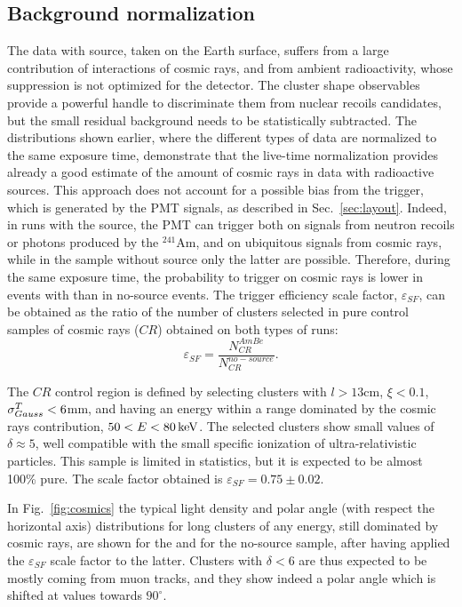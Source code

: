 \subsection{Background normalization}
\label{sec:background}
The data with \ambe source, taken on the Earth surface, suffers from a
large contribution of interactions of cosmic rays, and from ambient
radioactivity, whose suppression is not optimized for the \lemon
detector. The cluster shape observables provide a powerful handle to
discriminate them from nuclear recoils candidates, but the small
residual background needs to be statistically subtracted. The
distributions shown earlier, where the different types of data are
normalized to the same exposure time, demonstrate that the live-time
normalization provides already a good estimate of the amount of cosmic
rays in data with radioactive sources. This approach does not account
for a possible bias from the trigger, which is generated by the PMT
signals, as described in Sec.~\ref{sec:layout}. Indeed, in runs with
the \ambe source, the PMT can trigger both on signals from neutron
recoils or photons produced by the $^{241}$Am, and on ubiquitous
signals from cosmic rays, while in the sample without source only the
latter are possible.  Therefore, during the same exposure time,
the probability to trigger on cosmic rays is lower in events
with \ambe than in no-source events. The trigger efficiency scale
factor, $\varepsilon_{SF}$, can be obtained as the ratio of the number
of clusters selected in pure control samples of cosmic rays ($CR$)
obtained on both types of runs:
\begin{equation}
\label{eq:sfeff}
\varepsilon_{SF} = \frac{N^{AmBe}_{CR}}{N^{no-source}_{CR}}.
\end{equation}

The $CR$ control region is defined by selecting clusters with
$l>13$\unit{cm}, $\xi<0.1$, $\sigma^T_{Gauss}<6$\unit{mm}, and having an
energy within a range dominated by the cosmic rays contribution,
$50<E<80\,\textrm{ke\hspace{-.08em}V}$. The selected clusters show small values of
$\delta\approx5$, well compatible with the small specific ionization
of ultra-relativistic particles.  This sample is limited in
statistics, but it is expected to be almost 100\% pure. The scale
factor obtained is $\varepsilon_{SF}=0.75\pm0.02$.

In Fig.~\ref{fig:cosmics} the typical light density and polar angle
(with respect the horizontal axis) distributions for long clusters of
any energy, still dominated by cosmic rays, are shown for the \ambe
and for the no-source sample, after having applied the
$\varepsilon_{SF}$ scale factor to the latter. Clusters with
$\delta<6$ are thus expected to be mostly coming from muon tracks, and
they show indeed a polar angle which is shifted at values towards
$90^\circ$.


